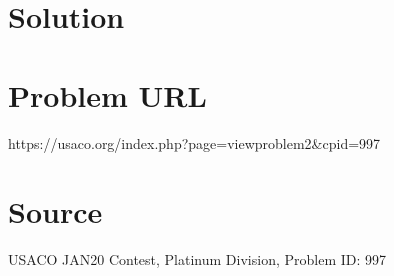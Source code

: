 \documentclass[12pt]{article}
\begin{document}
\section*{Solution}


\section*{Problem URL}
https://usaco.org/index.php?page=viewproblem2&cpid=997

\section*{Source}
USACO JAN20 Contest, Platinum Division, Problem ID: 997
\end{document}
